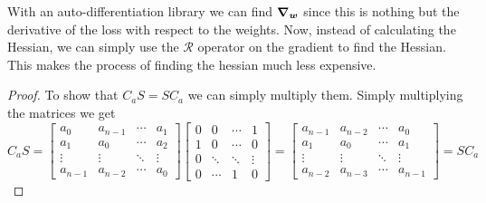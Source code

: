 \documentclass[twoside]{article}
\begin{document}
With an auto-differentiation library we can find $\grad_{\bm{w}}$ since this is nothing but the derivative of the loss
with respect to the weights. Now, instead of calculating the Hessian, we can simply use the $\mathcal{R}$ operator
on the gradient to find the Hessian. This makes the process of finding the hessian much less expensive.




\begin{proof}
	To show that $C_{a}S = SC_{a}$ we can simply multiply them. Simply multiplying the matrices we get
	\begin{equation*}
		C_{a}S =
		\begin{bmatrix}
			a_{0}     & a_{n - 1} & \cdots & a_{1}  \\
			a_{1}     & a_{0}     & \cdots & a_{2}  \\
			\vdots    & \vdots    & \ddots & \vdots \\
			a_{n - 1} & a_{n - 2} & \cdots & a_{0}
		\end{bmatrix}
		\begin{bmatrix}
			0 & 0      & \cdots & 1      \\
			1 & 0      & \cdots & 0      \\
			0 & \ddots & \ddots & \vdots \\
			0 & \cdots & 1      & 0
		\end{bmatrix}
		=
		\begin{bmatrix}
			a_{n - 1} & a_{n - 2} & \cdots & a_{0}     \\
			a_{1}     & a_{0}     & \cdots & a_{1}     \\
			\vdots    & \vdots    & \ddots & \vdots    \\
			a_{n - 2} & a_{n - 3} & \cdots & a_{n - 1}
		\end{bmatrix}
		= SC_{a}
	\end{equation*}
\end{proof}
\end{document}
